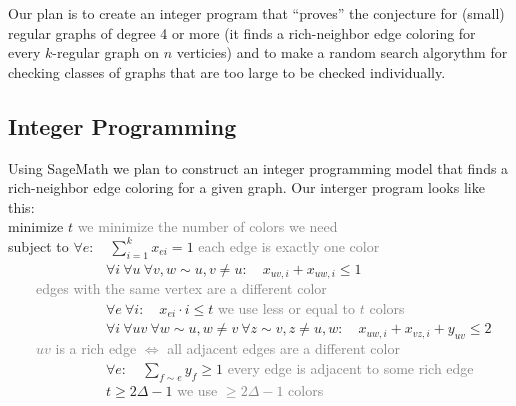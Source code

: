\documentclass[12pt,a4paper]{amsart}
\theoremstyle{definition} %
\theoremstyle{plain} %
\begin{document}
Our plan is to create an integer program that ``proves'' the conjecture for (small) regular graphs of degree 4 or more (it finds a rich-neighbor edge coloring for every $k$-regular graph on $n$ verticies) and to make a random search algorythm for checking classes of graphs that are too large to be checked individually.

\subsection{Integer Programming}

Using SageMath we plan to construct an integer programming model that finds a rich-neighbor edge coloring for a given graph. Our interger program looks like this:\\

minimize $t$ \hfill \textcolor{gray}{we minimize the number of colors we need}\\

subject to $\forall e: \quad \sum_{i=1}^{k} x_{ei} = 1$ \hfill \textcolor{gray}{each edge is exactly one color}\\

\ \ \ \ \ \ \ \ \ \ \ \ \ \ $\forall i \ \forall u \ \forall v, w \sim u, v \neq u: \quad x_{uv, i} + x_{uw, i} \leq 1$\\[0.1mm]
\textcolor{white}{hihi} \hfill \textcolor{gray}{edges with the same vertex are a different color}\\

\ \ \ \ \ \ \ \ \ \ \ \ \ \ $\forall e \ \forall i: \quad x_{ei} \cdot i \leq t$ \hfill \textcolor{gray}{we use less or equal to $t$ colors}\\

\ \ \ \ \ \ \ \ \ \ \ \ \ \ $\forall i \ \forall uv \ \forall w \sim u, w \neq v \ \forall z \sim v, z \neq u, w: \quad x_{uw, i} + x_{vz, i} + y_{uv} \leq 2$ \hfill \\[0.1mm]
\textcolor{white}{hihi} \hfill \textcolor{gray}{$uv$ is a rich edge $\Leftrightarrow$ all adjacent edges are a different color}\\

\ \ \ \ \ \ \ \ \ \ \ \ \ \ $\forall e: \quad \sum_{f \sim e}y_f \geq 1$ \hfill \textcolor{gray}{every edge is adjacent to some rich edge}\\

\ \ \ \ \ \ \ \ \ \ \ \ \ \ $t \geq 2 \Delta - 1$ \hfill \textcolor{gray}{we use $\geq 2 \Delta - 1$ colors}\\
\end{document}
